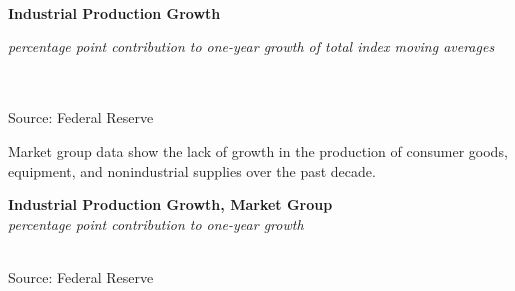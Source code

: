 \documentclass{report}
\makeatletter
\newcommand{\tbllink}[1]{\href{https://raw.githubusercontent.com/bdecon/US-chartbook/master/chartbook/data/#1}{\faTable}}
\newcommand*\short[1]{\expandafter\@gobbletwo\number\numexpr#1\relax}
\newcommand{\sbar}[4]{
		\addplot[ybar stacked, bar width=2.7pt, draw opacity=0, fill=#1] 
			table [x=#2, y=#3, col sep=comma]{#4};}
\newcommand{\dateaxisticks}{
		date coordinates in=x, axis line style={draw=none},
		xmax={2020-02-01},
		max space between ticks=40,	    
		xtick={{1990-01-01}, {1992-01-01}, {1994-01-01}, 
			{1996-01-01}, {1998-01-01}, {2000-01-01}, 
			{2002-01-01}, {2004-01-01}, {2006-01-01},
			{2008-01-01}, {2010-01-01}, {2012-01-01}, {2014-01-01},
		    {2016-01-01}, {2018-01-01}, {2020-01-01}},
		minor xtick={{1989-01-01}, {1991-01-01}, {1993-01-01},
			{1995-01-01}, {1997-01-01}, {1999-01-01}, 
			{2001-01-01}, {2003-01-01}, {2005-01-01}, {2007-01-01},
		    {2009-01-01}, {2011-01-01}, {2013-01-01}, {2015-01-01},
		    {2017-01-01}, {2019-01-01}},
		enlarge y limits={0.06}, enlarge x limits={0.01},
		}
\newcommand{\bbar}[2]{extra #1 ticks = {{#2}}, extra #1 tick labels = ,
		extra #1 tick style = {grid=major, grid style={thick, black!25}},}
\newcommand{\rbars}{
		\fill[color=black!10] (axis cs:{1990-07-01},\pgfkeysvalueof{/pgfplots/ymin}) rectangle 
			(axis cs:{1991-03-01}, \pgfkeysvalueof{/pgfplots/ymax});
		\fill[color=black!10] (axis cs:{2007-12-01},\pgfkeysvalueof{/pgfplots/ymin}) rectangle 
			(axis cs:{2009-07-01}, \pgfkeysvalueof{/pgfplots/ymax});
		\fill[color=black!10] (axis cs:{2001-03-01},\pgfkeysvalueof{/pgfplots/ymin}) rectangle 
			(axis cs:{2001-11-01}, \pgfkeysvalueof{/pgfplots/ymax});}
\makeatother
\begin{document}
{{{{\begin{minipage}{0.35\textwidth}
\end{minipage}\\

\begin{minipage}{0.76\textwidth}

\vspace{4mm} 

\noindent \normalsize \textbf{Industrial Production Growth}\\
\footnotesize{\textit{percentage point contribution to one-year growth of total index \hspace{12mm} moving averages}\\ 
\noindent {} \setlength{\tabcolsep}{3.1pt} \color{black!90}
		{\renewcommand{\arraystretch}{1.55}
		 \begin{tabular}{p{2mm} p{47mm} R{7.3mm} R{7.3mm} R{7.3mm} R{7.6mm} R{7.3mm} 
		   R{7.3mm} R{7.3mm} }
			 \hline
		\end{tabular}}	\\
		
\footnotesize{Source: Federal Reserve}}

\end{minipage}

\newpage

\begin{minipage}{0.76\textwidth}

\vspace{3mm}

\small Market group data show the lack of growth in the production of consumer goods, equipment, and nonindustrial supplies over the past decade.\\

\vspace{1mm}

\noindent \normalsize \textbf{Industrial Production Growth, Market Group}\\
\footnotesize{\textit{percentage point contribution to one-year growth}}\\
\noindent \hspace*{-2mm} \\
\footnotesize{Source: Federal Reserve} \hfill \tbllink{indprogr.csv}\\


\end{minipage}}}}}
\end{document}
